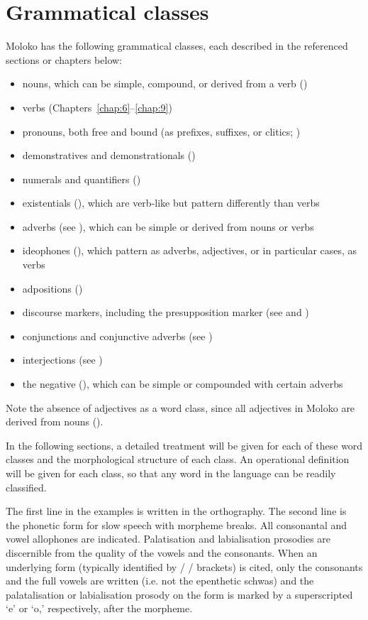 \chapter[Grammatical classes]{Grammatical classes}
\hypertarget{RefHeading1210801525720847}{}
Moloko has the following grammatical classes, each described in the referenced sections or chapters below:

\begin{itemize}
\item nouns, which can be simple, compound, or derived from a verb ()
\item verbs  (Chapters~\ref{chap:6}--\ref{chap:9})
\item pronouns, both free and bound (as prefixes, suffixes, or clitics; )
\item demonstratives and demonstrationals ()
\item numerals and quantifiers ()
\item existentials (), which are verb-like but pattern differently than verbs
\item adverbs (see ), which can be simple or derived from nouns or verbs
\item ideophones (), which pattern as adverbs, adjectives, or in particular cases, as verbs
\item adpositions () 
\item discourse markers, including the presupposition marker (see  and ) 
\item conjunctions and conjunctive adverbs (see )
\item interjections (see )
\item the negative (), which can be simple or compounded with certain adverbs
\end{itemize}

Note the absence of adjectives as a word class, since all adjectives in Moloko are derived from nouns ().

In the following sections, a detailed treatment will be given for each of these word classes and the morphological structure of each class.  An operational definition will be given for each class, so that any word in the language can be readily classified.

The first line in the examples is written in the orthography. The second line is the phonetic form for slow speech with morpheme breaks. All consonantal and vowel allophones are indicated.  Palatisation and labialisation prosodies are discernible from the quality of the vowels and the consonants. When an  underlying form (typically identified by / / brackets) is cited, only the consonants and the full vowels are written (i.e. not the epenthetic schwas) and the palatalisation or labialisation prosody on the form is marked by a superscripted ‘e’ or ‘o,’ respectively, after the morpheme. 

